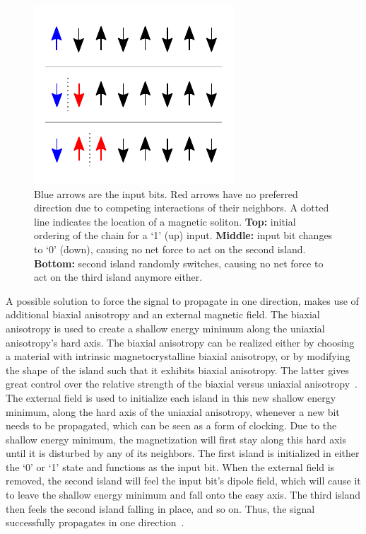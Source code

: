 \documentclass[11pt,a4paper,english,twoside]{article}
\begin{document}
\begin{figure}[b!]
    \centering
    \includegraphics[width=0.5\columnwidth]{Figures/Introduction/Soliton_random_walk_2steps.pdf}
    \caption{Blue arrows are the input bits. Red arrows have no preferred direction due to competing interactions of their neighbors. A dotted line indicates the location of a magnetic soliton. \textbf{Top:} initial ordering of the chain for a `1' (up) input. \textbf{Middle:} input bit changes to `0' (down), causing no net force to act on the second island. \textbf{Bottom:} second island randomly switches, causing no net force to act on the third island anymore either.}
    \label{fig:Intro_SolitonRandomWalk}
\end{figure}
A possible solution to force the signal to propagate in one direction, makes use of additional biaxial anisotropy and an external magnetic field. The biaxial anisotropy is used to create a shallow energy minimum along the uniaxial anisotropy's hard axis. The biaxial anisotropy can be realized either by choosing a material with intrinsic magnetocrystalline biaxial anisotropy, or by modifying the shape of the island such that it exhibits biaxial anisotropy. The latter gives great control over the relative strength of the biaxial versus uniaxial anisotropy~\cite{SubnanosecondPropagation_AnisotropyChains}. The external field is used to initialize each island in this new shallow energy minimum, along the hard axis of the uniaxial anisotropy, whenever a new bit needs to be propagated, which can be seen as a form of clocking. Due to the shallow energy minimum, the magnetization will first stay along this hard axis until it is disturbed by any of its neighbors. The first island is initialized in either the `0' or `1' state and functions as the input bit. When the external field is removed, the second island will feel the input bit's dipole field, which will cause it to leave the shallow energy minimum and fall onto the easy axis. The third island then feels the second island falling in place, and so on. Thus, the signal successfully propagates in one direction~\cite{NML_Carlton}. \par
\end{document}
